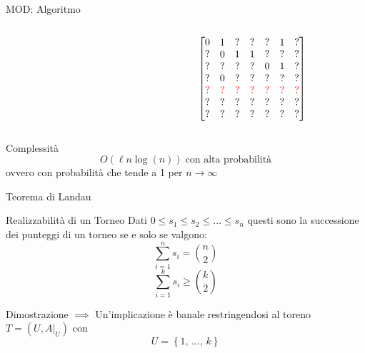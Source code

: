 \documentclass{beamer}
\begin{document}
\begin{frame}{MOD: Algoritmo}
	\begin{columns}
		\begin{column}{.5 \textwidth}
			\begin{algorithm}[H]
				\begin{algorithmic}[1]
							\ENDWHILE
						\ENDFOR
					\ENDWHILE
				\end{algorithmic}
			\end{algorithm}
		\end{column}
		\begin{column}{.5 \textwidth}
			\[
			\begin{bmatrix}
				0 & 1 & ? & ? & ? & 1 & ? \\
				? & 0 & 1 & 1 & ? & ? & ? \\
				? & ? & ? & ? & 0 & 1 & ? \\
				? & 0 & ? & ? & ? & ? & ? \\
				\color{red}? & \color{red}? & \color{red}? & \color{red}? & \color{red}? & \color{red}? & \color{red}? \\
				? & ? & ? & ? & ? & ? & ? \\
				? & ? & ? & ? & ? & ? & ? \\
		    \end{bmatrix}
			\]
		\end{column}
	\end{columns}
	\pause
	\begin{block}{Complessità}
		$$ O\left(\ell n \log(n)\right) \; \text{con alta probabilità} $$
		ovvero con probabilità che tende a 1 per $n \to \infty$
	\end{block}
\end{frame}
\begin{frame}{Teorema di Landau}
	\begin{block}{Realizzabilità di un Torneo}
		Dati $ 0 \leq s_1 \leq s_2 \leq  \dots \leq s_n $ questi sono la successione dei punteggi di un torneo se e solo se valgono:
		\begin{equation*}
			\sum_{i = 1}^n s_i = \binom{n}{2}
		\end{equation*}
		\begin{equation*}
			\sum _{i = 1}^k s_i \geq \binom{k}{2}
		\end{equation*}
	\end{block}
	\pause
	\begin{block}{Dimostrazione $\implies$}
		Un'implicazione è banale restringendosi al toreno $ T = (U, A|_{U}) $ con
		$$ U = \left\{ 1, \, \dots, \, k \right\} $$
	\end{block}
\end{frame}
\end{document}
